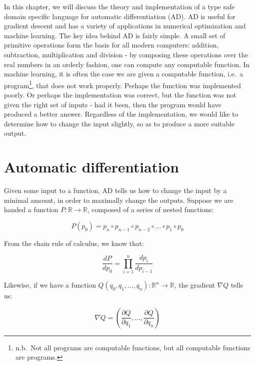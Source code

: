 \documentclass[12pt,initial,twoside,maitrise]{dms}
\numberwithin{equation}{section}
\numberwithin{table}{chapter}
\numberwithin{figure}{chapter}
\begin{document}
In this chapter, we will discuss the theory and implementation of a type safe domain specific language for automatic differentiation (AD). AD is useful for gradient descent and has a variety of applications in numerical optimization and machine learning. The key idea behind AD is fairly simple. A small set of primitive operations form the basis for all modern computers: addition, subtraction, multiplication and division - by composing these operations over the real numbers in an orderly fashion, one can compute any computable function. In machine learning, it is often the case we are given a computable function, i.e.\ a program\footnote{n.b.\ Not all programs are computable functions, but all computable functions are programs.}, that does not work properly. Perhaps the function was implemented poorly. Or perhaps the implementation was correct, but the function was not given the right set of inputs - had it been, then the program would have produced a better answer. Regardless of the implementation, we would like to determine how to change the input slightly, so as to produce a more suitable output.

\section{Automatic differentiation}

Given some input to a function, AD tells us how to change the input by a minimal amount, in order to maximally change the outputs. Suppose we are handed a function $P: \mathbb{R}\rightarrow\mathbb{R}$, composed of a series of nested functions:

%
\begin{equation}
    P(p_0)=p_n \circ p_{n-1} \circ p_{n-2} \circ ... \circ p_1 \circ p_0
\end{equation}
%

\noindent From the chain rule of calculus, we know that:

%
\begin{equation}
    \frac{dP}{dp_0} = {\displaystyle \prod_{i=1}^{n} \frac{dp_{i}}{dp_{i-1}}}
\end{equation}

\noindent Likewise, if we have a function $Q(q_0, q_1, \dots, q_n):  \mathbb{R}^n\rightarrow\mathbb{R}$, the gradient $\nabla Q$ tells us:

\begin{equation}
    \nabla Q = \left( \frac{\partial Q}{\partial q_1}, \dots, \frac{\partial Q}{\partial q_n}\right)
\end{equation}
\end{document}
